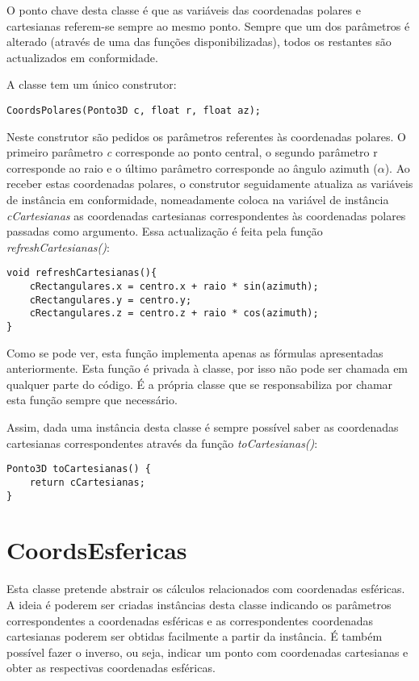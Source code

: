 O ponto chave desta classe é que as variáveis das coordenadas polares e cartesianas referem-se sempre ao mesmo ponto. Sempre que um dos parâmetros é alterado (através de uma das funções disponibilizadas), todos os restantes são actualizados em conformidade.

A classe tem um único construtor:

\begin{Verbatim}
CoordsPolares(Ponto3D c, float r, float az);
\end{Verbatim}

Neste construtor são pedidos os parâmetros referentes às coordenadas polares. O primeiro parâmetro \textit{c} corresponde ao ponto central, o segundo parâmetro r corresponde ao raio e o último parâmetro corresponde ao ângulo azimuth ($\alpha$). Ao receber estas coordenadas polares, o construtor seguidamente atualiza as variáveis de instância em conformidade, nomeadamente coloca na variável de instância \textit{cCartesianas} as coordenadas cartesianas correspondentes às coordenadas polares passadas como argumento. Essa actualização é feita pela função \textit{refreshCartesianas()}:

\begin{Verbatim}
void refreshCartesianas(){
	cRectangulares.x = centro.x + raio * sin(azimuth);
	cRectangulares.y = centro.y;
	cRectangulares.z = centro.z + raio * cos(azimuth);
}
\end{Verbatim}

Como se pode ver, esta função implementa apenas as fórmulas apresentadas anteriormente. Esta função é privada à classe, por isso não pode ser chamada em qualquer parte do código. É a própria classe que se responsabiliza por chamar esta função sempre que necessário.

Assim, dada uma instância desta classe é sempre possível saber as coordenadas cartesianas correspondentes através da função \textit{toCartesianas()}:

\begin{Verbatim}
Ponto3D toCartesianas() {
	return cCartesianas;
}
\end{Verbatim}


\section{CoordsEsfericas}
\label{p1:cEsfericas}
Esta classe pretende abstrair os cálculos relacionados com coordenadas esféricas. A ideia é poderem ser criadas instâncias desta classe indicando os parâmetros correspondentes a coordenadas esféricas e as correspondentes coordenadas cartesianas poderem ser obtidas facilmente a partir da instância. É também possível fazer o inverso, ou seja, indicar um ponto com coordenadas cartesianas e obter as respectivas coordenadas esféricas.

